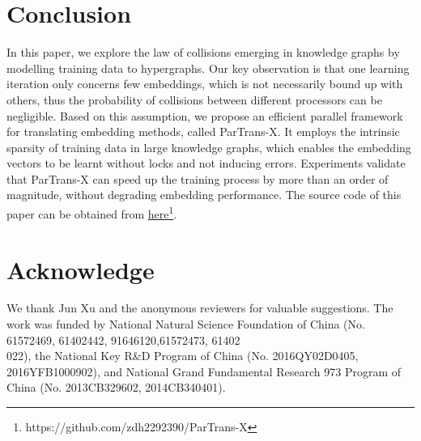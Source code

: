 \documentclass[sigconf]{acmart}
\begin{document}
\section{Conclusion}
In this paper, we explore the law of collisions emerging in knowledge graphs by modelling training data to hypergraphs. Our key observation is that 
one learning iteration only concerns few embeddings, which is not necessarily bound up with others, thus the probability of collisions between different processors can be negligible. 
Based on this assumption, we propose an efficient parallel framework for translating embedding methods, called ParTrans-X. It employs the intrinsic sparsity of training data in large knowledge graphs, which enables the embedding vectors to be learnt without locks and not inducing errors.  
Experiments validate that ParTrans-X can speed up the training process by more than an order of magnitude, without degrading embedding performance. The source code of this paper can be obtained from \href{https://github.com/zdh2292390/ParTrans-X}{here}\footnote{https://github.com/zdh2292390/ParTrans-X}.

\section{Acknowledge}
We thank Jun Xu and the anonymous reviewers for valuable suggestions. The work was funded by National Natural Science Foundation of China (No. 61572469, 61402442, 91646120,61572473, 61402\\022), the National Key R\&D Program of China (No. 2016QY02D0405, 2016YFB1000902), and National Grand Fundamental Research 973 Program of China (No. 2013CB329602, 2014CB340401).


 


\end{document}
